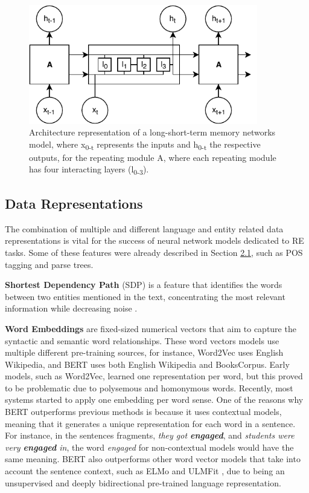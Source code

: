 \begin{figure}[hbt!]
\captionsetup{font=small}
\centering
\includegraphics[width=10cm]{images/figure_5.pdf}
\fontsize{9}{10.8}\caption[Long Short-Term Memory Networks Architecture]{Architecture representation of a long-short-term memory networks model, where x\textsubscript{0-t} represents the inputs and h\textsubscript{0-t} the respective outputs, for the repeating module A, where each repeating module has four interacting layers (l\textsubscript{0-3}).}
\label{figure:5}
\end{figure}


\hypertarget{2.5.2}{\subsection{Data Representations}}

The combination of multiple and different language and entity related data representations is vital for the success of neural network models dedicated to RE tasks. Some of these features were already described in Section \hyperlink{2.1}{2.1}, such as POS tagging and parse trees. 

\textbf{Shortest Dependency Path} (SDP) is a feature that identifies the words between two entities mentioned in the text, concentrating the most relevant information while decreasing noise \citep{xu-etal-2015-classifying}. 

\textbf{Word Embeddings} are fixed-sized numerical vectors that aim to capture the syntactic and semantic word relationships. These word vectors models use multiple different pre-training sources, for instance, Word2Vec \citep{Mikolov:2013:DRW:2999792.2999959} uses English Wikipedia, and BERT \citep{BERT} uses both English Wikipedia and BooksCorpus. Early models, such as Word2Vec, learned one representation per word, but this proved to be problematic due to polysemous and homonymous words. Recently, most systems started to apply one embedding per word sense. One of the reasons why BERT outperforms previous methods is because it uses contextual models, meaning that it generates a unique representation for each word in a sentence. For instance, in the sentences fragments, \textit{they got \textbf{engaged}}, and \textit{students were very \textbf{engaged} in}, the word \textit{engaged} for non-contextual models would have the same meaning. BERT also outperforms other word vector models that take into account the sentence context, such as ELMo \citep{DBLP:journals/corr/abs-1802-05365} and ULMFit \citep{howard-ruder-2018-universal}, due to being an unsupervised and deeply bidirectional pre-trained language representation. 


